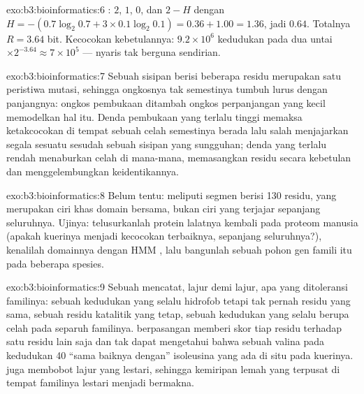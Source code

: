 \begin{solution}{exo:b3:bioinformatics:6}
: $2$, $1$, $0$, dan $2 - H$ dengan $H = -(0.7\log_{2}
0.7 + 3\times 0.1\log_{2} 0.1) = 0.36 + 1.00 = 1.36$, jadi $0.64$. Totalnya
$R = 3.64$ bit. Kecocokan kebetulannya: $9.2\times 10^{6}$ kedudukan pada dua
untai $\times 2^{-3.64} \approx 7\times 10^{5}$ ---  nyaris
tak berguna sendirian.
\end{solution}

\begin{solution}{exo:b3:bioinformatics:7}
Sebuah sisipan berisi beberapa residu merupakan satu peristiwa mutasi,
sehingga ongkosnya tak semestinya tumbuh lurus dengan panjangnya: ongkos
pembukaan ditambah ongkos perpanjangan yang kecil memodelkan hal itu. Denda
pembukaan yang terlalu tinggi memaksa ketakcocokan di tempat sebuah celah
semestinya berada lalu salah menjajarkan segala sesuatu sesudah sebuah sisipan
yang sungguhan; denda yang terlalu rendah menaburkan celah di mana-mana,
memasangkan residu secara kebetulan dan menggelembungkan keidentikannya.
\end{solution}

\begin{solution}{exo:b3:bioinformatics:8}
Belum tentu:  meliputi segmen berisi \num{130} residu,
yang merupakan ciri khas domain bersama, bukan ciri 
yang terjajar sepanjang seluruhnya. Ujinya: telusurkanlah protein lalatnya
kembali pada proteom manusia (apakah kuerinya menjadi kecocokan terbaiknya,
sepanjang seluruhnya?), kenalilah domainnya dengan HMM , lalu bangunlah
sebuah pohon gen famili itu pada beberapa spesies.
\end{solution}

\begin{solution}{exo:b3:bioinformatics:9}
Sebuah  mencatat, lajur demi lajur, apa yang ditoleransi familinya:
sebuah kedudukan yang selalu hidrofob tetapi tak pernah residu yang sama,
sebuah residu katalitik yang tetap, sebuah kedudukan yang selalu berupa celah
pada separuh familinya.  berpasangan memberi skor tiap residu
terhadap satu residu lain saja dan tak dapat mengetahui bahwa sebuah valina
pada kedudukan 40 ``sama baiknya dengan'' isoleusina yang ada di situ pada
kuerinya.  juga membobot lajur yang lestari, sehingga kemiripan lemah
yang terpusat di tempat familinya lestari menjadi bermakna.
\end{solution}


